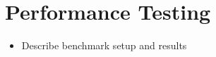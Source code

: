 \section{Performance Testing}

\begin{itemize}
    \item Describe benchmark setup and results
\end{itemize}